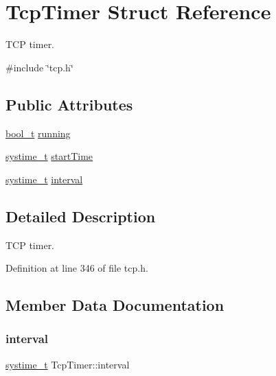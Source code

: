 \hypertarget{structTcpTimer}{}\section{Tcp\+Timer Struct Reference}
\label{structTcpTimer}


T\+CP timer.  




{\ttfamily \#include \char`\"{}tcp.\+h\char`\"{}}

\subsection*{Public Attributes}
\begin{DoxyCompactItemize}
\item 
\hyperlink{compiler__port_8h_a812d16e5494522586b3784e55d479912}{bool\+\_\+t} \hyperlink{structTcpTimer_adadb16ad3ae86a863d6d8f4f9ddb54d6}{running}
\item 
\hyperlink{compiler__port_8h_ae3e32a98d431a02106616da3071832dd}{systime\+\_\+t} \hyperlink{structTcpTimer_a567cd1bec04b2683a21940b9dea3f210}{start\+Time}
\item 
\hyperlink{compiler__port_8h_ae3e32a98d431a02106616da3071832dd}{systime\+\_\+t} \hyperlink{structTcpTimer_a1f9b0b5f3e2c2f5cc361c9bcb3724713}{interval}
\end{DoxyCompactItemize}


\subsection{Detailed Description}
T\+CP timer. 

Definition at line 346 of file tcp.\+h.



\subsection{Member Data Documentation}
\mbox{\label{structTcpTimer_a1f9b0b5f3e2c2f5cc361c9bcb3724713}} 
\subsubsection{\texorpdfstring{interval}{interval}}
{\footnotesize\ttfamily \hyperlink{compiler__port_8h_ae3e32a98d431a02106616da3071832dd}{systime\+\_\+t} Tcp\+Timer\+::interval}



